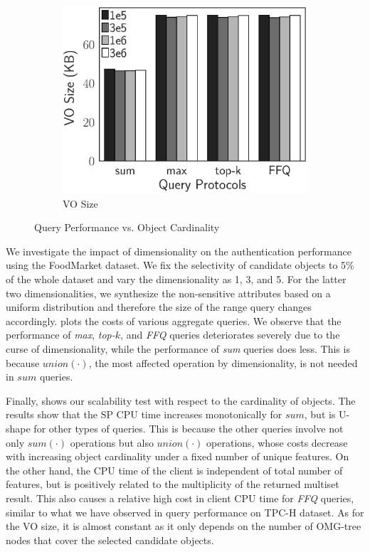 \begin{figure}[t]
\begin{subfigure}[b]{.33\linewidth}
    \includegraphics[width=\linewidth]{exp-figs/aggregate-queries/cardinality_vo.eps}
    \caption{VO Size}
  \end{subfigure}
  \caption{Query Performance vs. Object Cardinality}\label{fig:aggregate-queries:diversity}
\end{figure}

We investigate the impact of dimensionality on the authentication performance using the FoodMarket dataset. We fix the selectivity of candidate objects to 5\% of the whole dataset and vary the dimensionality as 1, 3, and 5. For the latter two dimensionalities, we synthesize the non-sensitive attributes based on a uniform distribution and therefore the size of the range query changes accordingly.  plots the costs of various aggregate queries. We observe that the performance of \emph{max}, \emph{top-$k$}, and \emph{FFQ} queries deteriorates severely due to the curse of dimensionality, while the performance of \emph{sum} queries does less. This is because $union(\cdot)$, the most affected operation by dimensionality, is not needed in $sum$ queries.

Finally,  shows our scalability test with respect to the cardinality of objects.
The results show that the SP CPU time increases monotonically for $sum$, but is U-shape for other types of queries. This is because the other queries involve not only $sum(\cdot)$ operations but also $union(\cdot)$ operations, whose costs decrease with increasing object cardinality under a fixed number of unique features. On the other hand, the CPU time of the client is independent of total number of features, but is positively related to the multiplicity of the returned multiset result. This also causes a relative high cost in client CPU time for \emph{FFQ} queries, similar to what we have observed in query performance on TPC-H dataset. As for the VO size, it is almost constant as it only depends on the number of OMG-tree nodes that cover the selected candidate objects.

